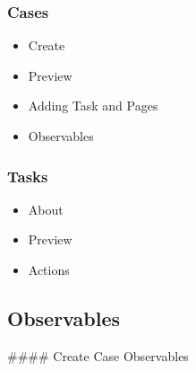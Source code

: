 

% 


\subsubsection{Cases}
\begin{itemize}
    \item Create
    
    \newpage
    \item Preview
    
    \newpage
    \item Adding Task and Pages
    
    \newpage
    \item Observables
    
    
\end{itemize}
\newpage

\subsubsection{Tasks}
\begin{itemize}
    \item About
    
    \newpage
    \item Preview
    
    \newpage
    \item Actions
    
\end{itemize}

\subsection{Observables}
\begin{markdown}
#### Create Case Observables  
\end{markdown}

%     

%     
